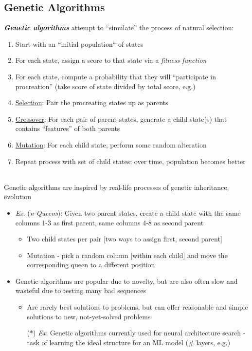 \documentclass[12pt]{extarticle}
\theoremstyle{definition}
\theoremstyle{remark}
\newcommand{\pstart}[0]{\noindent}
\newcommand{\newp}[0]{~\\ \pstart}
\newcommand{\term}[1]{\noindent\textbf{\textit{#1}}}
\begin{document}
\subsection{Genetic Algorithms}
\pstart
\term{Genetic algorithms} attempt to ``simulate'' the process of natural selection: \begin{enumerate}
    \item Start with an ``initial population`` of states
    \item For each state, assign a score to that state via a \textit{fitness function}
    \item For each state, compute a probability that they will ``participate in procreation'' (take score of state divided by total score, e.g.)
    \item \ul{Selection}: Pair the procreating states up as parents
    \item \ul{Crossover}: For each pair of parent states, generate a child state(s) that contains ``features'' of both parents
    \item \ul{Mutation}: For each child state, perform some random alteration
    \item Repeat process with set of child states; over time, population becomes better
\end{enumerate}

\newp
Genetic algorithms are inspired by real-life processes of genetic inheritance, evolution \begin{itemize}
    \item \textit{Ex}. (\textit{n-Queens}): Given two parent states, create a child state with the same columns 1-3 as first parent, same columns 4-8 as second parent \begin{itemize}
        \item Two child states per pair [two ways to assign first, second parent]
        \item Mutation - pick a random column [within each child] and move the corresponding queen to a different position
    \end{itemize}
    \item Genetic algorithms are popular due to novelty, but are also often slow and wasteful due to testing many bad sequences \begin{itemize}
        \item Are rarely best solutions to problems, but can offer reasonable and simple solutions to new, not-yet-solved problems
        \item[($\ast$)] \textit{Ex}: Genetic algorithms currently used for neural architecture search - task of learning the ideal structure for an ML model (\# layers, e.g.)
    \end{itemize}
\end{itemize} 
\end{document}

